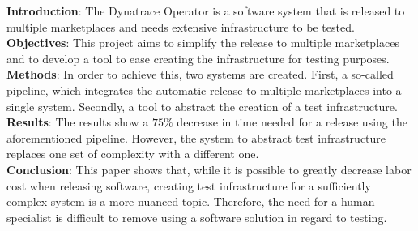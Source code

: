 \textbf{Introduction}:
The Dynatrace Operator is a software system that is released to multiple marketplaces and needs extensive infrastructure to be tested. \\
\textbf{Objectives}:
This project aims to simplify the release to multiple marketplaces and to develop a tool to ease creating the infrastructure for testing purposes. \\
\textbf{Methods}:
In order to achieve this, two systems are created.
First, a so-called pipeline, which integrates the automatic release to multiple marketplaces into a single system.
Secondly, a tool to abstract the creation of a test infrastructure. \\
\textbf{Results}:
The results show a $75 \%$ decrease in time needed for a release using the aforementioned pipeline.
However, the system to abstract test infrastructure replaces one set of complexity with a different one. \\
\textbf{Conclusion}:
This paper shows that, while it is possible to greatly decrease labor cost when releasing software, creating test infrastructure for a sufficiently complex system is a more nuanced topic.
Therefore, the need for a human specialist is difficult to remove using a software solution in regard to testing.

